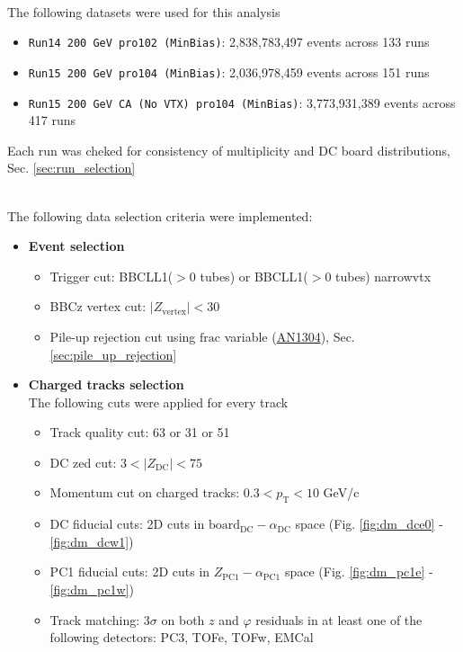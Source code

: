 \begin{description}
\begin{itemize}
         \end{itemize}
		\item[Data set and event selection]~\\
         The following datasets were used for this analysis
         \begin{itemize}
            \item \texttt{Run14 200 GeV \HeAu pro102 (MinBias)}: 2,838,783,497 events across 133 runs
            \item \texttt{Run15 200 GeV \pAl pro104 (MinBias)}: 2,036,978,459 events across 151 runs 
            \item \texttt{Run15 200 GeV \pAu CA (No VTX) pro104 (MinBias)}: 3,773,931,389 events across 417 runs
         \end{itemize}
         Each run was cheked for consistency of multiplicity and DC board distributions, Sec. \ref{sec:run_selection}
		\item[Analysis cuts]~\\
			The following data selection criteria were implemented:
			\begin{itemize}
            \item \textbf{Event selection}
					\begin{itemize}
                  \item Trigger cut: BBCLL1($>0$ tubes) or BBCLL1($>0$ tubes) narrowvtx
                  \item BBCz vertex cut: $\lvert Z_{\text{vertex}} \rvert < 30$
                  \item Pile-up rejection cut using $\text{frac}$ variable (\href{https://phenix-intra.sdcc.bnl.gov/phenix/WWW/p/draft/dcm07e/DoubleInteractionAN/small-system-double.pdf}{AN1304}), Sec. \ref{sec:pile_up_rejection}
					\end{itemize}
            \item \textbf{Charged tracks selection} \\					
					\label{text:track_selection}
					The following cuts were applied for every track
					\begin{itemize}
						\item Track quality cut: 63 or 31 or 51
                  \item DC zed cut: $3 < \lvert Z_{\text{DC}} \rvert < 75$
                  \item Momentum cut on charged tracks: $0.3 < p_\text{T} < 10$ GeV/c
                  \item DC fiducial cuts: 2D cuts in $\text{board}_{\text{DC}} - \alpha_{\text{DC}}$ space (Fig. \ref{fig:dm_dce0} - \ref{fig:dm_dcw1})
                  \item PC1 fiducial cuts: 2D cuts in $Z_{\text{PC1}} - \alpha_{\text{PC1}}$ space (Fig. \ref{fig:dm_pc1e} - \ref{fig:dm_pc1w})
						\item Track matching: $3\sigma$ on both $z$ and $\varphi$ residuals in at least one of the following detectors: PC3, TOFe, TOFw, EMCal
					\end{itemize}


\end{itemize}
\end{description}
